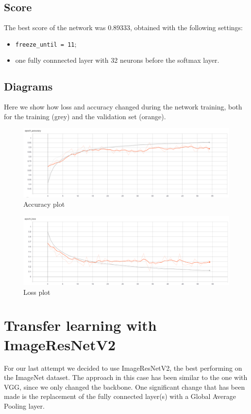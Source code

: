 \documentclass[12pt,a4paper]{report}
\begin{document}
		\subsection{Score}
The best score of the network was 0.89333, obtained with the following settings: 
	\begin{itemize}
		\item	\texttt{freeze\_until = 11};
		\item one fully connnected layer with 32 neurons before the softmax layer.
	\end{itemize}

		\subsection{Diagrams}
Here we show how loss and accuracy changed during the network training, both for the training (grey) and the validation set (orange).
		\begin{figure}[H]
			\includegraphics[scale = 0.5, center]{vgg accuracy}
			\caption{Accuracy plot}
		\end{figure}
		\begin{figure}[H]
			\includegraphics[scale = 0.5, center]{vgg loss}
			\caption{Loss plot}
		\end{figure}

\section{Transfer learning with ImageResNetV2}
For our last attempt we decided to use ImageResNetV2, the best performing on the ImageNet dataset. The approach in this case has been similar to the one with VGG, since we only changed the backbone. One significant change that has been made is the replacement of the fully connected layer(s) with a Global Average Pooling layer.
\end{document}
